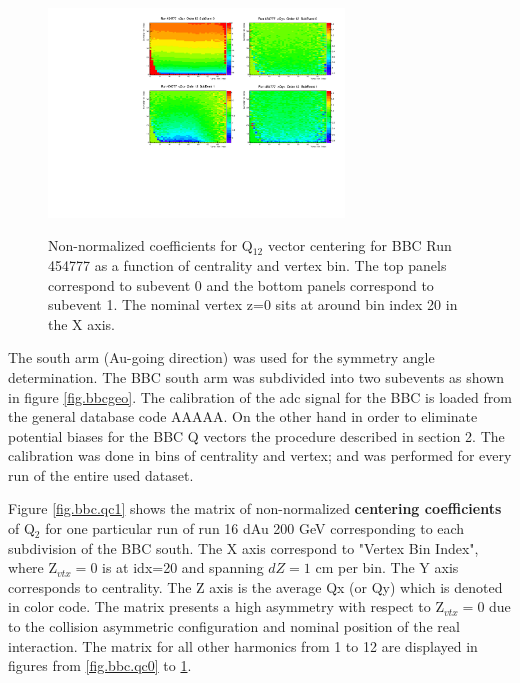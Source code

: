 \documentclass{article}
\begin{document}
\begin{figure}
\centering
\includegraphics[width=0.7\textwidth]{fig_eventplane/QC_454777_ORD8.pdf}
\label{fig.bbc.qc8}
\caption{Non-normalized coefficients for Q$_{12}$ vector centering for BBC Run 454777 as a function of centrality and vertex bin. The top panels correspond to subevent 0 and the bottom panels correspond to subevent 1. The nominal vertex z=0 sits at around bin index 20 in the X axis.}
\end{figure}

The south arm (Au-going direction) was used for the symmetry angle determination.
The BBC south arm was subdivided into two subevents as shown in figure \ref{fig.bbcgeo}.
The calibration of the adc signal for the BBC is loaded from the general database code AAAAA.
On the other hand in order to eliminate potential biases for the BBC Q vectors the procedure described in section 2.
The calibration was done in bins of centrality and vertex; and was performed for every run of the entire used dataset.

Figure \ref{fig.bbc.qc1} shows the matrix of non-normalized {\bf centering coefficients} of Q$_2$ for one particular run of run 16 dAu 200 GeV corresponding to each subdivision of the BBC south. The X axis correspond to "Vertex Bin Index", where Z$_{vtx}=0$ is at idx=20 and spanning $dZ=1$ cm per bin. The Y axis corresponds to centrality. The Z axis is the average Qx (or Qy) which is denoted in color code. The matrix presents a high asymmetry with respect to Z$_{vtx}=0$  due to the collision asymmetric configuration and nominal position of the real interaction. The matrix for all other harmonics from 1 to 12 are displayed in figures from \ref{fig.bbc.qc0} to \ref{fig.bbc.qc8}.
\end{document}
